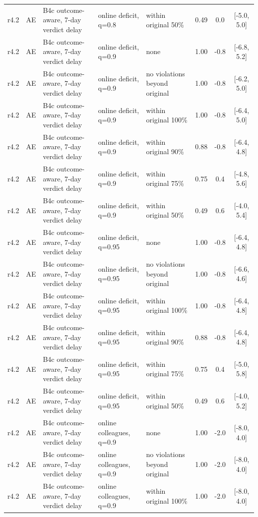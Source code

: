 \documentclass[10pt,onecolumn,letterpaper]{article}
\begin{document}
\begin{longtable}{lllp{4.2cm}p{3.4cm}ccc}
r4.2 & AE & B4c outcome-aware, 7-day verdict delay & online deficit, q=0.8 & within original 50\% & 0.49 & 0.0 & [-5.0, 5.0] \\
r4.2 & AE & B4c outcome-aware, 7-day verdict delay & online deficit, q=0.9 & none & 1.00 & -0.8 & [-6.8, 5.2] \\
r4.2 & AE & B4c outcome-aware, 7-day verdict delay & online deficit, q=0.9 & no violations beyond original & 1.00 & -0.8 & [-6.2, 5.0] \\
r4.2 & AE & B4c outcome-aware, 7-day verdict delay & online deficit, q=0.9 & within original 100\% & 1.00 & -0.8 & [-6.4, 5.0] \\
r4.2 & AE & B4c outcome-aware, 7-day verdict delay & online deficit, q=0.9 & within original 90\% & 0.88 & -0.8 & [-6.4, 4.8] \\
r4.2 & AE & B4c outcome-aware, 7-day verdict delay & online deficit, q=0.9 & within original 75\% & 0.75 & 0.4 & [-4.8, 5.6] \\
r4.2 & AE & B4c outcome-aware, 7-day verdict delay & online deficit, q=0.9 & within original 50\% & 0.49 & 0.6 & [-4.0, 5.4] \\
r4.2 & AE & B4c outcome-aware, 7-day verdict delay & online deficit, q=0.95 & none & 1.00 & -0.8 & [-6.4, 4.8] \\
r4.2 & AE & B4c outcome-aware, 7-day verdict delay & online deficit, q=0.95 & no violations beyond original & 1.00 & -0.8 & [-6.6, 4.6] \\
r4.2 & AE & B4c outcome-aware, 7-day verdict delay & online deficit, q=0.95 & within original 100\% & 1.00 & -0.8 & [-6.4, 4.8] \\
r4.2 & AE & B4c outcome-aware, 7-day verdict delay & online deficit, q=0.95 & within original 90\% & 0.88 & -0.8 & [-6.4, 4.8] \\
r4.2 & AE & B4c outcome-aware, 7-day verdict delay & online deficit, q=0.95 & within original 75\% & 0.75 & 0.4 & [-5.0, 5.8] \\
r4.2 & AE & B4c outcome-aware, 7-day verdict delay & online deficit, q=0.95 & within original 50\% & 0.49 & 0.6 & [-4.0, 5.2] \\
r4.2 & AE & B4c outcome-aware, 7-day verdict delay & online colleagues, q=0.9 & none & 1.00 & -2.0 & [-8.0, 4.0] \\
r4.2 & AE & B4c outcome-aware, 7-day verdict delay & online colleagues, q=0.9 & no violations beyond original & 1.00 & -2.0 & [-8.0, 4.0] \\
r4.2 & AE & B4c outcome-aware, 7-day verdict delay & online colleagues, q=0.9 & within original 100\% & 1.00 & -2.0 & [-8.0, 4.0] \\

\end{longtable}
\end{document}
